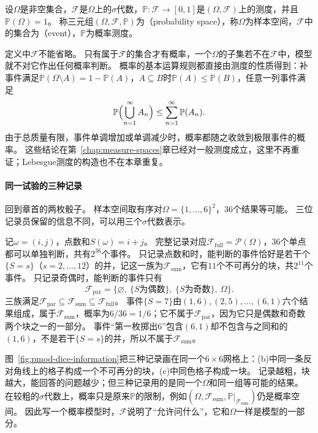 \begin{definition}[概率空间]
\label{def:pmod-probability-space}
设$\Omega$是非空集合，$\mathcal F$是$\Omega$上的$\sigma$代数，$\mathbb P:\mathcal F\to[0,1]$是$(\Omega,\mathcal F)$上的测度，并且$\mathbb P(\Omega)=1$。
称三元组$(\Omega,\mathcal F,\mathbb P)$为（probability space），称$\Omega$为样本空间，$\mathcal F$中的集合为（event），$\mathbb P$为概率测度。
\end{definition}

定义中$\mathcal F$不能省略。
只有属于$\mathcal F$的集合才有概率，一个$\Omega$的子集若不在$\mathcal F$中，模型就不对它作出任何概率判断。
概率的基本运算规则都直接由测度的性质得到：补事件满足$\mathbb P(\Omega\setminus A)=1-\mathbb P(A)$，$A\subseteq B$时$\mathbb P(A)\le\mathbb P(B)$，任意一列事件满足
\[
  \mathbb P\Bigl(\bigcup_{n=1}^\infty A_n\Bigr)\le\sum_{n=1}^\infty\mathbb P(A_n).
\]
由于总质量有限，事件单调增加或单调减少时，概率都随之收敛到极限事件的概率。
这些结论在第~\ref{chap:measure-spaces}章已经对一般测度成立，这里不再重证；Lebesgue测度的构造也不在本章重复。

\paragraph{同一试验的三种记录}
回到章首的两枚骰子。
样本空间取有序对$\Omega=\{1,\dots,6\}^2$，$36$个结果等可能。
三位记录员保留的信息不同，可以用三个$\sigma$代数表示。

\begin{example}[两枚骰子的三种观测]
\label{ex:pmod-dice-records}
记$\omega=(i,j)$，点数和$S(\omega)=i+j$。
完整记录对应$\mathcal F_{\mathrm{full}}=\mathcal P(\Omega)$，$36$个单点都可以单独判断，共有$2^{36}$个事件。
只记录点数和时，能判断的事件恰好是若干个$\{S=s\}$（$s=2,\dots,12$）的并，记这一族为$\mathcal F_{\mathrm{sum}}$，它有$11$个不可再分的块，共$2^{11}$个事件。
只记录奇偶时，能判断的事件只有
\[
  \mathcal F_{\mathrm{par}}=\bigl\{\varnothing,\ \{S\text{为偶数}\},\ \{S\text{为奇数}\},\ \Omega\bigr\}.
\]
三族满足$\mathcal F_{\mathrm{par}}\subseteq\mathcal F_{\mathrm{sum}}\subseteq\mathcal F_{\mathrm{full}}$。
事件$\{S=7\}$由$(1,6),(2,5),\dots,(6,1)$六个结果组成，属于$\mathcal F_{\mathrm{sum}}$，概率为$6/36=1/6$；它不属于$\mathcal F_{\mathrm{par}}$，因为它只是偶数和奇数两个块之一的一部分。
事件“第一枚掷出$6$”包含$(6,1)$却不包含与之同和的$(1,6)$，不是若干$\{S=s\}$的并，所以不属于$\mathcal F_{\mathrm{sum}}$。
\end{example}

图~\ref{fig:pmod-dice-information}把三种记录画在同一个$6\times6$网格上：(b)中同一条反对角线上的格子构成一个不可再分的块，(c)中同色格子构成一块。
记录越粗，块越大，能回答的问题越少；但三种记录用的是同一个$\Omega$和同一组等可能的结果。
在较粗的$\sigma$代数上，概率只是原来$\mathbb P$的限制，例如$(\Omega,\mathcal F_{\mathrm{sum}},\mathbb P|_{\mathcal F_{\mathrm{sum}}})$仍是概率空间。
因此写一个概率模型时，$\mathcal F$说明了“允许问什么”，它和$\Omega$一样是模型的一部分。

